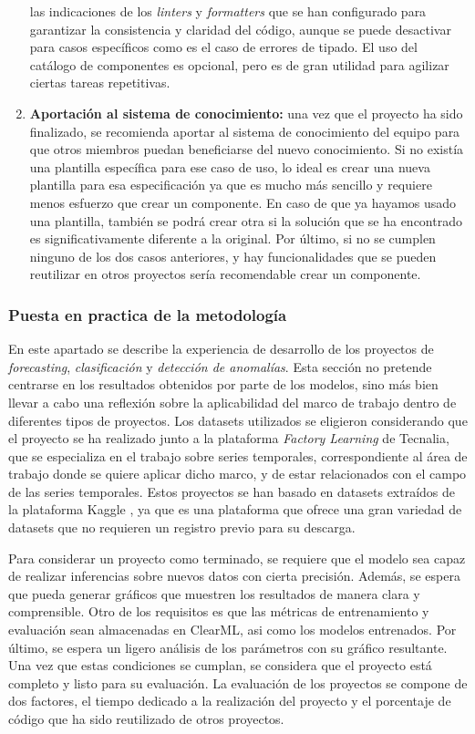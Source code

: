 \begin{enumerate}
    las indicaciones de los \textit{linters} y \textit{formatters} que se han configurado
    para garantizar la consistencia y claridad del código, aunque se puede desactivar
    para casos específicos como es el caso de errores de tipado. El uso del catálogo
    de componentes es opcional, pero es de gran utilidad para agilizar ciertas tareas
    repetitivas.
    \item \textbf{Aportación al sistema de conocimiento:} una vez que el proyecto
    ha sido finalizado, se recomienda aportar al sistema de conocimiento del equipo
    para que otros miembros puedan beneficiarse del nuevo conocimiento. Si
    no existía una plantilla específica para ese caso de uso, lo ideal es crear
    una nueva plantilla para esa especificación ya que es mucho más sencillo
    y requiere menos esfuerzo que crear un componente. En caso de que ya hayamos
    usado una plantilla, también se podrá crear otra si la solución que
    se ha encontrado es significativamente diferente a la original. Por último,
    si no se cumplen ninguno de los dos casos anteriores, y hay funcionalidades
    que se pueden reutilizar en otros proyectos sería recomendable crear un
    componente.
\end{enumerate}

\subsubsection{Puesta en practica de la metodología}
En este apartado se describe la experiencia de desarrollo de
los proyectos de \textit{forecasting}, \textit{clasificación} y \textit{detección de anomalías}.
Esta sección no pretende centrarse en los resultados obtenidos por parte de los modelos, sino
más bien llevar a cabo una reflexión sobre la aplicabilidad del marco de trabajo
dentro de diferentes tipos de proyectos. Los datasets utilizados se eligieron considerando que el proyecto se ha realizado junto a la plataforma \textit{Factory Learning} de Tecnalia,
que se especializa en el trabajo sobre series temporales, correspondiente al área de trabajo donde 
se quiere aplicar dicho marco, y de estar relacionados con el campo 
de las series temporales. Estos proyectos se han basado en datasets extraídos de la plataforma Kaggle \cite{Kaggle}, 
ya que es una plataforma que ofrece una gran variedad de datasets que no requieren un registro previo para su descarga.\medskip

Para considerar un proyecto como terminado, se requiere que el modelo sea capaz de realizar inferencias 
sobre nuevos datos con cierta precisión. Además, se espera que pueda generar gráficos que muestren los 
resultados de manera clara y comprensible. Otro de los requisitos es que las métricas de entrenamiento
y evaluación sean almacenadas en ClearML, asi como los modelos entrenados. Por último, se espera un ligero
análisis de los parámetros con su gráfico resultante. Una vez que estas condiciones se cumplan, 
se considera que el proyecto está completo y listo para su evaluación. La evaluación de los proyectos
se compone de dos factores, el tiempo dedicado a la realización del proyecto y el porcentaje de código
que ha sido reutilizado de otros proyectos.

